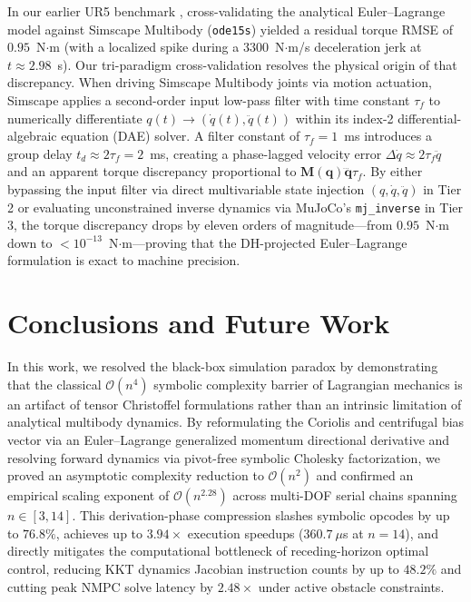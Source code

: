 \documentclass[fleqn,10pt]{article}
\begin{document}
	In our earlier UR5 benchmark \cite{ihab2026urdf2dt}, cross-validating the analytical Euler--Lagrange model against Simscape Multibody (\texttt{ode15s}) yielded a residual torque RMSE of $0.95$~N$\cdot$m (with a localized spike during a $3300$~N$\cdot$m/s deceleration jerk at $t \approx 2.98$~s). Our tri-paradigm cross-validation resolves the physical origin of that discrepancy. When driving Simscape Multibody joints via motion actuation, Simscape applies a second-order input low-pass filter with time constant $\tau_f$ to numerically differentiate $q(t) \to (\dot{q}(t), \ddot{q}(t))$ within its index-2 differential-algebraic equation (DAE) solver. A filter constant of $\tau_f = 1$~ms introduces a group delay $t_d \approx 2\tau_f = 2$~ms, creating a phase-lagged velocity error $\Delta \dot{q} \approx 2\tau_f \ddot{q}$ and an apparent torque discrepancy proportional to $\bm{M}(\bm{q})\dddot{\bm{q}}\tau_f$. By either bypassing the input filter via direct multivariable state injection $(q, \dot{q}, \ddot{q})$ in Tier 2 or evaluating unconstrained inverse dynamics via MuJoCo's \texttt{mj\_inverse} in Tier 3, the torque discrepancy drops by eleven orders of magnitude---from $0.95$~N$\cdot$m down to $< 10^{-13}$~N$\cdot$m---proving that the DH-projected Euler--Lagrange formulation is exact to machine precision.
	
	\section*{Conclusions and Future Work}
	
	In this work, we resolved the black-box simulation paradox by demonstrating that the classical $\mathcal{O}(n^4)$ symbolic complexity barrier of Lagrangian mechanics is an artifact of tensor Christoffel formulations rather than an intrinsic limitation of analytical multibody dynamics. By reformulating the Coriolis and centrifugal bias vector via an Euler--Lagrange generalized momentum directional derivative and resolving forward dynamics via pivot-free symbolic Cholesky factorization, we proved an asymptotic complexity reduction to $\mathcal{O}(n^2)$ and confirmed an empirical scaling exponent of $\mathcal{O}(n^{2.28})$ across multi-DOF serial chains spanning $n \in [3, 14]$. This derivation-phase compression slashes symbolic opcodes by up to $76.8\%$, achieves up to $3.94\times$ execution speedups ($360.7~\mu$s at $n=14$), and directly mitigates the computational bottleneck of receding-horizon optimal control, reducing KKT dynamics Jacobian instruction counts by up to $48.2\%$ and cutting peak NMPC solve latency by $2.48\times$ under active obstacle constraints.
	
\end{document}
